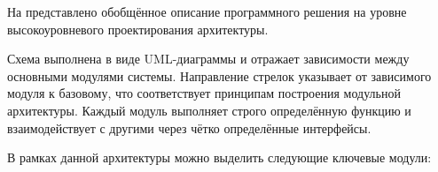 
На  представлено обобщённое описание программного решения на уровне высокоуровневого проектирования архитектуры.


\pagebreak

Схема выполнена в виде UML-диаграммы и отражает зависимости между основными модулями системы. Направление стрелок указывает от зависимого модуля к базовому, что соответствует принципам построения модульной архитектуры. Каждый модуль выполняет строго определённую функцию и взаимодействует с другими через чётко определённые интерфейсы.

В рамках данной архитектуры можно выделить следующие ключевые модули:

